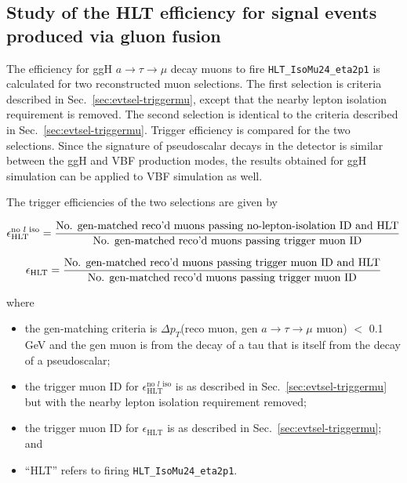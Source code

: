 
\subsection{Study of the HLT efficiency for signal events produced via gluon fusion\label{sec:lep-id-eff-ggH-HLT}}
The efficiency for ggH $a\rightarrow\tau\rightarrow\mu$ decay muons to fire \texttt{HLT\_IsoMu24\_eta2p1} is calculated for two reconstructed muon selections.  The first selection is  criteria described in Sec.~\ref{sec:evtsel-triggermu}, except that the nearby lepton isolation requirement is removed.  The second selection is identical to the criteria described in Sec.~\ref{sec:evtsel-triggermu}.  Trigger efficiency is compared for the two selections.  Since the signature of pseudoscalar decays in the detector is similar between the ggH and VBF production modes, the results obtained for ggH simulation can be applied to VBF simulation as well.

The trigger efficiencies of the two selections are given by 

\begin{equation}
\epsilon_{\text{HLT}}^{\text{no }l\text{ iso}} = \frac{\text{No. gen-matched reco'd muons passing no-lepton-isolation ID and HLT}}{\text{No. gen-matched reco'd muons passing trigger muon ID}} \\
\label{eq:muonHLTeff-noliso}
\end{equation}

\begin{equation}
\epsilon_{\text{HLT}} = \frac{\text{No. gen-matched reco'd muons passing trigger muon ID and HLT}}{\text{No. gen-matched reco'd muons passing trigger muon ID}} \\
\label{eq:muonHLTeff}
\end{equation}

where

\begin{itemize}
\item the gen-matching criteria is $\Delta$$p_T$(reco muon, gen $a\rightarrow\tau\rightarrow\mu$ muon) $<$ 0.1 GeV and the gen muon is from the decay of a tau that is itself from the decay of a pseudoscalar;
\item the trigger muon ID for $\epsilon_{\text{HLT}}^{\text{no }l\text{ iso}}$ is as described in Sec.~\ref{sec:evtsel-triggermu} but with the nearby lepton isolation requirement removed;
\item the trigger muon ID for $\epsilon_{\text{HLT}}$ is as described in Sec.~\ref{sec:evtsel-triggermu}; and
\item ``HLT'' refers to firing \texttt{HLT\_IsoMu24\_eta2p1}.
\end{itemize}

